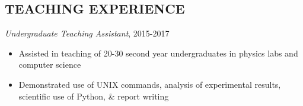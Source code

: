 \documentclass[letter, margin, 10pt]{res} %
\begin{document}
\begin{resume}
\section{TEACHING EXPERIENCE}

{\sl Undergraduate Teaching Assistant}, 2015-2017
\begin{itemize}[noitemsep,topsep=0pt,parsep=0pt,partopsep=0pt]
\item Assisted in teaching of 20-30 second year undergraduates in physics labs and computer science 
\item Demonstrated use of UNIX commands, analysis of experimental results, scientific use of Python, \& report writing
\end{itemize}



 





 

\end{resume}
\end{document}
